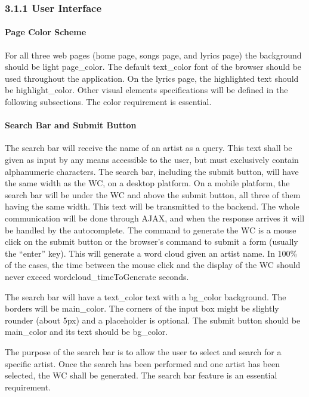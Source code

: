 \documentclass[]{article}
\begin{document}
\subsubsection{3.1.1 User Interface}\label{user-interface}

\paragraph{Page Color Scheme}\label{page-color-scheme}

For all three web pages (home page, songs page, and lyrics page) the
background should be light page\_color. The default text\_color font of
the browser should be used throughout the application. On the lyrics
page, the highlighted text should be highlight\_color. Other visual
elements specifications will be defined in the following subsections.
The color requirement is essential.

\paragraph{Search Bar and Submit
Button}\label{search-bar-and-submit-button}

The search bar will receive the name of an artist as a query. This text
shall be given as input by any means accessible to the user, but must
exclusively contain alphanumeric characters. The search bar, including
the submit button, will have the same width as the WC, on a desktop
platform. On a mobile platform, the search bar will be under the WC and
above the submit button, all three of them having the same width. This
text will be transmitted to the backend. The whole communication will be
done through AJAX, and when the response arrives it will be handled by
the autocomplete. The command to generate the WC is a mouse click on the
submit button or the browser's command to submit a form (usually the
``enter'' key). This will generate a word cloud given an artist name. In
100\% of the cases, the time between the mouse click and the display of
the WC should never exceed wordcloud\_timeToGenerate seconds.

The search bar will have a text\_color text with a bg\_color background.
The borders will be main\_color. The corners of the input box might be
slightly rounder (about 5px) and a placeholder is optional. The submit
button should be main\_color and its text should be bg\_color.

The purpose of the search bar is to allow the user to select and search
for a specific artist. Once the search has been performed and one artist
has been selected, the WC shall be generated. The search bar feature is
an essential requirement.
\end{document}
